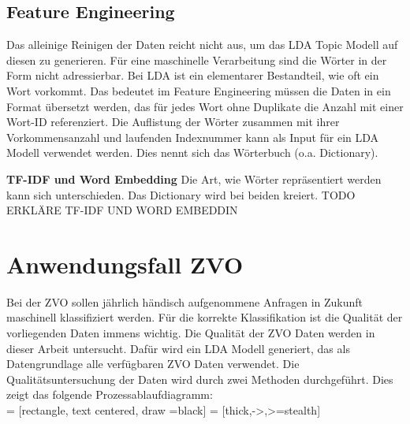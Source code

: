 \documentclass[german,version-2020-11]{uzl-thesis}
\begin{document}
\subsection{Feature Engineering}
Das alleinige Reinigen der Daten reicht nicht aus, um das LDA Topic Modell auf diesen zu generieren. Für eine maschinelle Verarbeitung sind die Wörter in der Form nicht adressierbar. Bei LDA ist ein elementarer Bestandteil, wie oft ein Wort vorkommt. Das bedeutet im Feature Engineering müssen die Daten in ein Format übersetzt werden, das für jedes Wort ohne Duplikate die Anzahl mit einer Wort-ID referenziert. Die Auflistung der Wörter zusammen mit ihrer Vorkommensanzahl und laufenden Indexnummer kann als Input für ein LDA Modell verwendet werden. Dies nennt sich das Wörterbuch (o.a. Dictionary). 

\textbf{TF-IDF und Word Embedding}
Die Art, wie Wörter repräsentiert werden kann sich unterschieden. Das Dictionary wird bei beiden kreiert. TODO ERKLÄRE TF-IDF UND WORD EMBEDDIN


\section{Anwendungsfall ZVO}
Bei der ZVO sollen jährlich händisch aufgenommene Anfragen in Zukunft maschinell klassifiziert werden. Für die korrekte Klassifikation ist die Qualität der vorliegenden Daten immens wichtig. Die Qualität der ZVO Daten werden in dieser Arbeit untersucht. Dafür wird ein LDA Modell generiert, das als Datengrundlage alle verfügbaren ZVO Daten verwendet. Die Qualitätsuntersuchung der Daten wird durch zwei Methoden durchgeführt. Dies zeigt das folgende Prozessablaufdiagramm:  \\

 = [rectangle, text centered, draw =black]
 = [thick,->,>=stealth]
\end{document}
